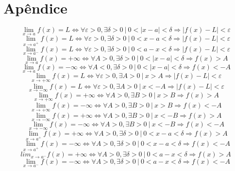 \newpage
\section{Apêndice}
\[\lim_{x\rightarrow  a}f(x)= L \Leftrightarrow \forall \varepsilon >0, \exists \delta > 0 \: | \: 0< |x-a|< \delta \Rightarrow |f(x)-L|<\varepsilon\]
\[\lim_{x\rightarrow  a^{+}}f(x)= L \Leftrightarrow \forall \varepsilon >0, \exists \delta > 0 \: | \: 0< x-a< \delta \Rightarrow |f(x)-L|<\varepsilon\]
\[\lim_{x\rightarrow  a^{-}}f(x)= L \Leftrightarrow \forall \varepsilon >0, \exists \delta > 0 \: | \: 0< a-x< \delta \Rightarrow |f(x)-L|<\varepsilon\]
\[\lim_{x\rightarrow  a}f(x)= +\infty \Leftrightarrow \forall A >0, \exists \delta > 0 \: | \: 0< |x-a|< \delta \Rightarrow f(x) > A\]
\[\lim_{x\rightarrow  a}f(x)= -\infty \Leftrightarrow \forall A <0, \exists \delta > 0 \: | \: 0< |x-a|< \delta \Rightarrow f(x)< -A\]
\[\lim_{x\rightarrow  +\infty}f(x)= L \Leftrightarrow \forall \varepsilon >0, \exists A > 0 \: | \: x>A \Rightarrow |f(x)-L|<\varepsilon\]
\[\lim_{x\rightarrow  -\infty}f(x)= L \Leftrightarrow \forall \varepsilon >0, \exists A > 0 \: | \: x<-A \Rightarrow |f(x)-L|<\varepsilon\]
\[\lim_{x\rightarrow  +\infty}f(x)= +\infty \Leftrightarrow \forall A >0, \exists B > 0 \: | \: x>B \Rightarrow f(x)>A\]
\[\lim_{x\rightarrow  +\infty}f(x)= -\infty \Leftrightarrow \forall A >0, \exists B > 0 \: | \: x>B \Rightarrow f(x)<-A\]
\[\lim_{x\rightarrow  -\infty}f(x)= +\infty \Leftrightarrow \forall A >0, \exists B > 0 \: | \: x<-B \Rightarrow f(x)>A\]
\[\lim_{x\rightarrow  -\infty}f(x)= -\infty \Leftrightarrow \forall A >0, \exists B > 0 \: | \: x<-B \Rightarrow f(x)<-A\]
\[\lim_{x\rightarrow  a^{+}}f(x)= +\infty \Leftrightarrow \forall A >0, \exists \delta > 0 \: | \: 0< x-a< \delta \Rightarrow f(x)>A\]
\[\lim_{x\rightarrow  a^{+}}f(x)= -\infty \Leftrightarrow \forall A >0, \exists \delta > 0 \: | \: 0< x-a< \delta \Rightarrow f(x)<-A\]
\[lim_{x\rightarrow  a^{-}}f(x)= +\infty \Leftrightarrow \forall A >0, \exists \delta > 0 \: | \: 0< a-x< \delta \Rightarrow f(x)>A\]
\[\lim_{x\rightarrow  a^{-}}f(x)= -\infty \Leftrightarrow \forall A >0, \exists \delta > 0 \: | \: 0< a-x< \delta \Rightarrow f(x) < -A\]